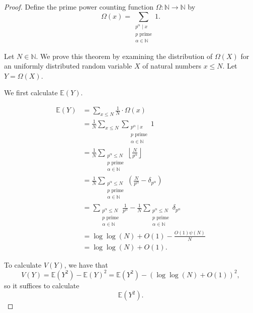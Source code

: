 \documentclass[12pt,reqno]{amsart}
\begin{document}
\begin{proof}
Define the prime power counting function \(\Omega : \mathbb{N} \to \mathbb{N} \) by
\[
    \Omega(x) = \sum _{\substack{ p ^{\alpha} \mid x \\ p \text{ prime} \\ \alpha \in \mathbb{N}  }} 1
.\]

Let \(N \in \mathbb{N} \). We prove this theorem by examining the distribution of \(\Omega(X)\) for an
uniformly distributed random variable \(X\) of natural numbers \(x \leq N\).
Let \(Y = \Omega(X)\).

We first calculate \(\mathbb{E} (Y)\).

\begin{align*}
\mathbb{E} (Y) & = \sum _{x \leq N} \frac{1}{N} \cdot \Omega(x)\\
& = \frac{1}{N} \sum _{x \leq N } \sum _{\substack{ p^{\alpha} \mid x \\ p \text{ prime} \\ \alpha \in \mathbb{N}  }} 1\\
& = \frac{1}{N} \sum _{\substack{ p^{\alpha} \leq N \\ p \text{ prime} \\ \alpha \in \mathbb{N}  }} \left\lfloor \frac{N}{p ^{\alpha}}  \right\rfloor \\
& = \frac{1}{N} \sum _{\substack{ p^{\alpha}\leq N \\ p \text{ prime}  \\ \alpha \in \mathbb{N}   }} \left( \frac{N}{p ^{\alpha}} - \delta_{p ^{\alpha}}  \right)  \\
& = \sum _{\substack{ p^{\alpha}\leq N \\p  \text{ prime} \\ \alpha \in  \mathbb{N}  }} \frac{1}{p ^{\alpha}} - \frac{1}{N} \sum _{\substack{ p ^{\alpha} \leq N \\ p \text{ prime} \\ \alpha \in  \mathbb{N} }}  \delta_{p ^{\alpha}} \\
& = \log\log \left( N \right) + O(1) - \frac{O(1) \psi(N)}{N} \\
& = \log\log \left( N \right) + O(1).
\end{align*}

To calculate \(V(Y)\), we have that
\[
    V(Y) = \mathbb{E} (Y^{2}) - \mathbb{E} (Y)^{2} = \mathbb{E} (Y^{2}) - \left( \log\log \left( N \right) + O(1) \right) ^{2}
,\]
so it suffices to calculate
\[
    \mathbb{E} (Y^{2})
.\]


\end{proof}
\end{document}
